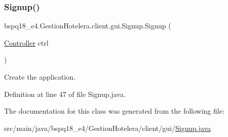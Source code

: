 \subsubsection{\texorpdfstring{Signup()}{Signup()}}
{\footnotesize\ttfamily bspq18\+\_\+e4.\+Gestion\+Hotelera.\+client.\+gui.\+Signup.\+Signup (\begin{DoxyParamCaption}\item[{\mbox{\hyperlink{classbspq18__e4_1_1_gestion_hotelera_1_1client_1_1controller_1_1_controller}{Controller}}}]{ctrl }\end{DoxyParamCaption})}

Create the application. 

Definition at line 47 of file Signup.\+java.



The documentation for this class was generated from the following file\+:\begin{DoxyCompactItemize}
\item 
src/main/java/bspq18\+\_\+e4/\+Gestion\+Hotelera/client/gui/\mbox{\hyperlink{_signup_8java}{Signup.\+java}}\end{DoxyCompactItemize}
